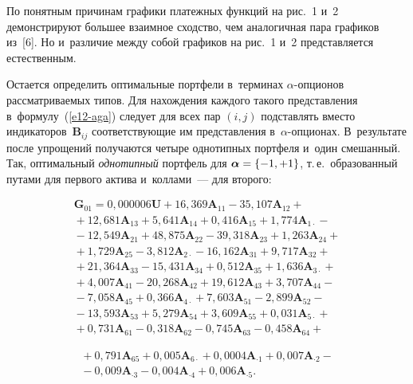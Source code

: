\begin{multicols}{2}
  По понятным причинам графики платежных функций на рис.~1 и~2 
демонстрируют большее взаимное сходство, чем аналогичная пара графиков 
из~[6]. Но и~различие между собой графиков на рис.~1 и~2 пред\-став\-ля\-ет\-ся 
естественным. 
  
  Остается определить оптимальные портфели в~терминах $\alpha$-оп\-ци\-онов 
рас\-смат\-ри\-ва\-емых типов. Для нахождения каждого такого пред\-став\-ле\-ния 
в~формулу~(\ref{e12-aga}) следует для всех пар $(i,j)$ под\-став\-лять вмес\-то 
индикаторов~$\bm{B}_{ij}$ со\-от\-вет\-ст\-ву\-ющие им пред\-став\-ле\-ния  
в~$\alpha$-оп\-ци\-онах. В~результате после упрощений получаются четыре 
однотипных портфеля и~один смешанный. Так, оптимальный 
\textit{однотипный} портфель для $\bm{\alpha}\hm= \{-1, +1\}$, т.\,е.\ образованный 
путами для первого актива и~коллами~--- для второго: 

\vspace*{-2pt}

\noindent
 \begin{multline*}
  \bm{G}_{01}=0{,}000006 \bm{U} + 16{,}369\bm{A}_{11} - 35{,}107\bm{A}_{12} + {}\\
  {}+12{,}681\bm{A}_{13} + 5{,}641\bm{A}_{14} + 0{,}416\bm{A}_{15} + 1{,}774\bm{A}_{1\cdot} - {}\\
{}-12{,}549\bm{A}_{21} + 48{,}875\bm{A}_{22} - 39{,}318\bm{A}_{23} + 1{,}263\bm{A}_{24} + {}\\
{}+ 1{,}729\bm{A}_{25} - 3{,}812\bm{A}_{2\cdot} - 16{,}162\bm{A}_{31} + 9{,}717\bm{A}_{32} + {}\\
{}+21{,}364\bm{A}_{33} - 15{,}431\bm{A}_{34} + 0{,}512\bm{A}_{35} + 1{,}636\bm{A}_{3\cdot} + {}\\
{}+ 4{,}007\bm{A}_{41} - 20{,}268\bm{A}_{42} + 19{,}612\bm{A}_{43} + 3{,}707\bm{A}_{44} - {}\\
{}-7{,}058\bm{A}_{45} + 0{,}366\bm{A}_{4\cdot} + 7{,}603\bm{A}_{51} - 2{,}899\bm{A}_{52} - {}\\
{}- 13{,}593\bm{A}_{53} + 5{,}279\bm{A}_{54} + 3{,}609\bm{A}_{55} + 0,031\bm{A}_{5\cdot} + {}\\
{}+ 0{,}731\bm{A}_{61} - 0{,}318\bm{A}_{62} - 0{,}745\bm{A}_{63} - 0{,}458\bm{A}_{64} + {}
\end{multline*}

\noindent
\begin{multline*}
{}+0{,}791\bm{A}_{65} + 0{,}005\bm{A}_{6\cdot} + 0{,}0004\bm{A}_{\cdot1} + 0{,}007\bm{A}_{\cdot 2} -{}\\
{}- 0{,}009\bm{A}_{\cdot 3} - 0{,}004\bm{A}_{\cdot 4} + 0{,}006\bm{A}_{\cdot 5}.
\end{multline*}


\end{multicols}
